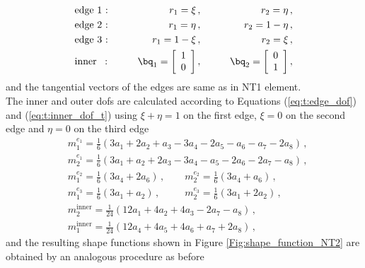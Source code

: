 \begin{equation}
\begin{aligned}
&\textrm{edge 1 :} \qquad  &r_1 =\xi\,,&   \qquad   &r_2 = \eta\,,  \\
&\textrm{edge 2 :} \qquad  &r_1 =  \eta\,,& \qquad &r_2 = 1- \eta\,, \\
&\textrm{edge 3 :} \qquad  &r_1 = 1-\xi\,,& \qquad &r_2 = \xi\,, \\  
&\textrm{inner  \, :} \qquad   &\bq_1 =    \left[ \begin{array}{c}
1 \\
0 
  \end{array} \right],& \qquad &\bq_2 = \left[ \begin{array}{c}
0 \\
1  
  \end{array} \right], 
  \end{aligned}
\end{equation}
and the tangential vectors of the edges are same as in NT1 element. \\ 
The inner and outer dofs are calculated according to Equations
(\ref{eq:t:edge_dof}) and (\ref{eq:t:inner_dof_t}) using  $\xi + \eta = 1$ on the first edge, $\xi=0$ on the second edge and $\eta=0$ on the third edge
 \begin{equation}
 \begin{aligned}
 &m^{e_1}_{1} = \frac{1}{6}(3 a_1 + 2 a_2 + a_3 - 3 a_4 - 2 a_5 - a_6 - a_7 - 2 a_8) \,, \\ 
 &m^{e_1}_{2} =\frac{1}{6}  (3 a_1 + a_2 + 2 a_3 - 3 a_4 - a_5 - 2 a_6 - 2 a_7 - a_8) \,,\\ 
  &m^{e_2}_{1} = \frac{1}{6} (3a_4 + 2 a_6) \,, \qquad
  m^{e_2}_{2} = \frac{1}{6} ( 3a_4 + a_6) \,, \\
& m^{e_3}_{1} = \frac{1}{6} (3a_1 + a_2) \,,  \qquad \,\,\, m^{e_3}_{2} = \frac{1}{6} (3a_1 + 2a_2) \,, \\ 
  &m^\textrm{inner}_2 = \frac{1}{24} (12 a_1 + 4 a_2 + 4 a_3 - 2 a_7 - a_8)  \,, \\
 &m^\textrm{inner}_1 =  \frac{1}{24} (12 a_4 + 4 a_5 + 4 a_6 + a_7 + 2 a_8) \,, 
 \end{aligned}
\end{equation}
and the resulting shape functions shown in Figure \ref{Fig:shape_function_NT2} are obtained by an analogous procedure as before
